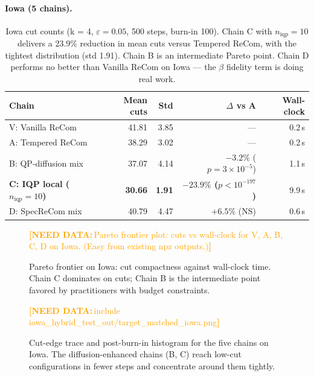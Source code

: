 \documentclass[11pt]{article}
\newcommand{\needdata}[1]{\textcolor{orange}{\textbf{[NEED DATA:}\,#1\textbf{]}}}
\begin{document}
\paragraph{Iowa (5 chains).}\label{sec:exp-iowa}

\begin{table}[H]
\centering
\small
\begin{tabular}{lrrrr}
\toprule
Chain & Mean cuts & Std & $\Delta$ vs A & Wall-clock \\
\midrule
V: Vanilla ReCom         & 41.81 & 3.85 & ---                               & 0.2\,s \\
A: Tempered ReCom        & 38.29 & 3.02 & ---                               & 0.2\,s \\
B: QP-diffusion mix      & 37.07 & 4.14 & $-3.2\%$ ($p = 3 \times 10^{-5}$) & 1.1\,s \\
\textbf{C: IQP local ($n_{\mathrm{iqp}} = 10$)}
                         & \textbf{30.66} & \textbf{1.91}
                         & \textbf{$-23.9\%$ ($p < 10^{-197}$)}              & 9.9\,s \\
D: SpecReCom mix         & 40.79 & 4.47 & $+6.5\%$ (NS)                     & 0.6\,s \\
\bottomrule
\end{tabular}
\caption{Iowa cut counts (k = 4, $\varepsilon = 0.05$, 500 steps,
  burn-in 100). Chain C with $n_{\mathrm{iqp}} = 10$ delivers a 23.9\%
  reduction in mean cuts versus Tempered ReCom, with the tightest
  distribution (std 1.91). Chain B is an intermediate Pareto point.
  Chain D performs no better than Vanilla ReCom on Iowa --- the
  $\beta$ fidelity term is doing real work.}\label{tab:iowa-headline}
\end{table}

\begin{figure}[H]
  \centering
  \needdata{Pareto frontier plot: cuts vs wall-clock for V, A, B, C, D
    on Iowa. (Easy from existing npz outputs.)}\\
  \caption{Pareto frontier on Iowa: cut compactness against
    wall-clock time. Chain C dominates on cuts; Chain B is the
    intermediate point favored by practitioners with budget
    constraints.}
  \label{fig:pareto-iowa}
\end{figure}

\begin{figure}[H]
  \centering
  \needdata{include iowa\_hybrid\_test\_out/target\_matched\_iowa.png}\\
  \caption{Cut-edge trace and post-burn-in histogram for the five
    chains on Iowa. The diffusion-enhanced chains (B, C) reach
    low-cut configurations in fewer steps and concentrate around them
    tightly.}
  \label{fig:iowa-trace}
\end{figure}
\end{document}
